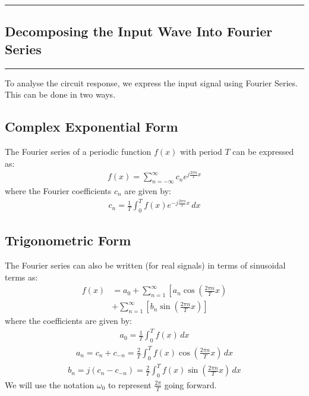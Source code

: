 \newpage
\begin{multicols}{2}
\tableofcontents
\end{multicols}
\newpage

{\color{gray}\hrule}
\begin{center}
\section{Decomposing the Input Wave Into Fourier Series}
\bigskip
\end{center}
{\color{gray}\hrule}
\begin{multicols}{2}

To analyse the circuit response, we express the input signal using Fourier Series. This can be done in two ways.

\subsection{Complex Exponential Form}
The Fourier series of a periodic function \( f(x) \) with period \( T \) can be expressed as:
\begin{align}
f(x) = \sum_{n=-\infty}^{\infty} c_n e^{j \frac{2\pi n}{T} x}  
\end{align}
where the Fourier coefficients \( c_n \) are given by:
\begin{align}
c_n = \frac{1}{T} \int_{0}^{T} f(x) e^{-j \frac{2\pi n}{T} x} \, dx \label{1}
\end{align}

\subsection{Trigonometric Form}
The Fourier series can also be written (for real signals) in terms of sinusoidal terms as:
\begin{equation}
\begin{split}
f(x) &= a_0 + \sum_{n=1}^{\infty} \left[ a_n \cos\left(\frac{2\pi n}{T} x \right) \right. \\
&+ \sum_{n=1}^{\infty} \left[ b_n \sin\left(\frac{2\pi n}{T} x \right) \right]
\end{split}
\end{equation}
where the coefficients are given by:
\begin{align}
a_0 = \frac{1}{T} \int_{0}^{T} f(x) \, dx \label{2}
\end{align}
\begin{align}
a_n =c_n+c_{-n} = \frac{2}{T} \int_{0}^{T} f(x) \cos\left(\frac{2\pi n}{T} x \right) \, dx \label{3}
\end{align}
\begin{align}
b_n = j(c_n-c_{-n}) =\frac{2}{T} \int_{0}^{T} f(x) \sin\left(\frac{2\pi n}{T} x \right) \, dx \label{4}
\end{align}
We will use the notation $\omega_0$ to represent $\frac{2\pi}{T}$ going forward.


\end{multicols}
